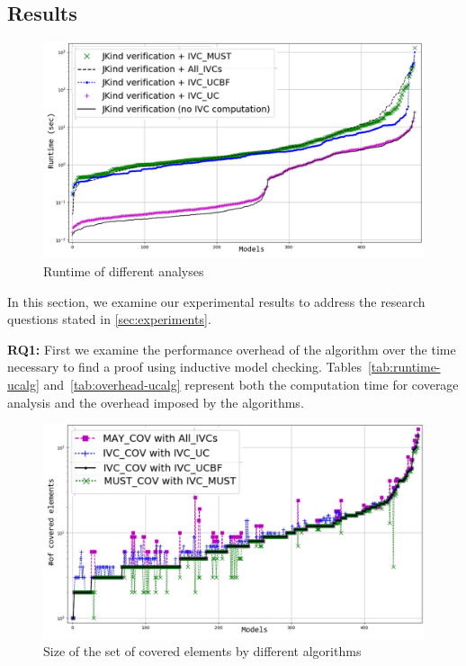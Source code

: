 \subsection{Results}
\label{sec:results}

\newcommand{\takeaway}[1]{
\vspace{6pt}
\noindent\fbox{\parbox{0.98\columnwidth}{#1}}
\vspace{6pt}
}

\begin{figure}
  \centering
  \includegraphics[width=\columnwidth]{figs/timing_analyses_all_sorted.jpg}
  \vspace{-0.2in}
  \caption{Runtime of different analyses}\label{fig:runtimeall}
\end{figure}


In this section, we examine our experimental results to address the research questions stated in \ref{sec:experiments}.

\textbf{RQ1:} First we examine the performance overhead of the \ucalg algorithm over the time necessary to find a proof using inductive model checking. Tables~\ref{tab:runtime-ucalg}
and~\ref{tab:overhead-ucalg} represent both the
computation time for coverage analysis
and the overhead imposed by the algorithms.

\begin{figure}
  \centering
  \includegraphics[width=\columnwidth]{figs/size.jpg}
  \vspace{-0.2in}
  \caption{Size of the set of covered elements by different algorithms}\label{fig:size}
\end{figure}


